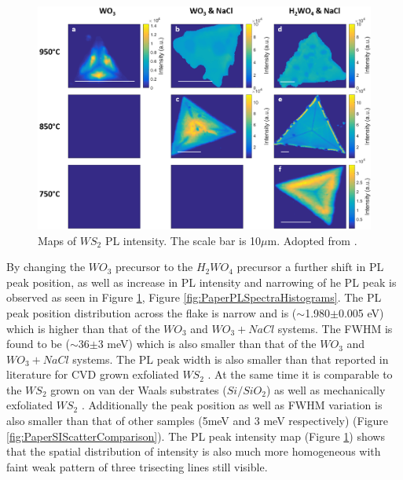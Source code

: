 \begin{figure}[h]
	\begin{center}
		\includegraphics[scale=0.3]{PaperPLMaps.png}
		\caption{Maps of $WS_2$ PL intensity. The scale bar is 10$\mu$m. Adopted from \cite{Reale2017}.}
		\label{fig:PaperPLMaps}
	\end{center}
\end{figure}

By changing the $WO_3$ precursor to the $H_2WO_4$ precursor a further shift in PL peak position, as well as increase in PL intensity and narrowing of he PL peak is observed as seen in Figure \ref{fig:PaperPLMaps}, Figure \ref{fig:PaperPLSpectraHistograms}. The PL peak position distribution across the flake is narrow and is ({$\sim$}1.980{$\pm$}0.005 eV) which is higher than that of the $WO_3$ and $WO_3 + NaCl$ systems. The FWHM is found to be ({$\sim$}36{$\pm$}3 meV) which is also smaller than that of the $WO_3$ and $WO_3 + NaCl$ systems. The PL peak width is also smaller than that reported in literature for CVD grown \cite{ExtraordinaryRoomTemperaturePhotoluminescenceInTriangularWS2Monolayers}\cite{Rong2014}\cite{Hu2016}\cite{Kang2015a} exfoliated $WS_2$ \cite{EvolutionOfElectronicStructureInAtomicallyThinSheetsOfWS2AndWSe2}\cite{doi:10.1021/nn5059908}. At the same time it is comparable to the $WS_2$ grown on van der Waals substrates ($Si/SiO_2$) \cite{doi:10.1021/nn503093k} as well as mechanically exfoliated $WS_2$ \cite{doi:10.1021/nl500171v}. Additionally the peak position as well as FWHM variation is also smaller than that of other samples (5meV and 3 meV respectively) (Figure \ref{fig:PaperSIScatterComparison}). The PL peak intensity map (Figure \ref{fig:PaperPLMaps}) shows that the spatial distribution of intensity is also much more homogeneous with faint weak pattern of three trisecting lines still visible.

